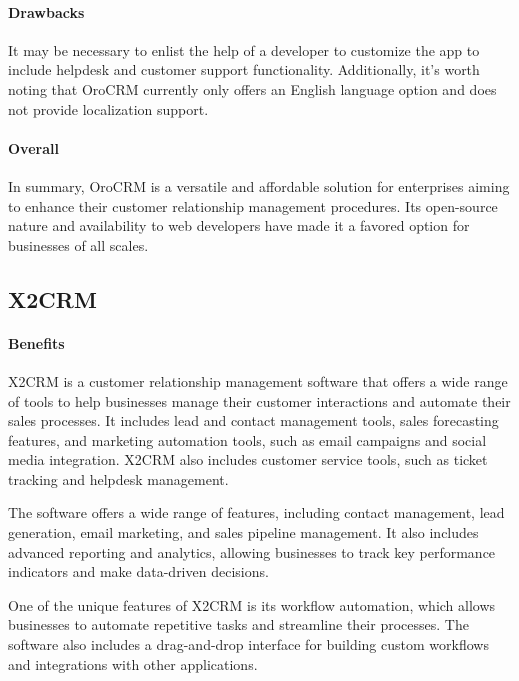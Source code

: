 \documentclass{article}
\begin{document}
\paragraph{Drawbacks}

It may be necessary to enlist the help of a developer to customize the app to include helpdesk and customer support functionality. Additionally, it's worth noting that OroCRM currently only offers an English language option and does not provide localization support.

\paragraph{Overall}

In summary, OroCRM is a versatile and affordable solution for enterprises aiming to enhance their customer relationship management procedures. Its open-source nature and availability to web developers have made it a favored option for businesses of all scales.

\subsection{X2CRM}

\paragraph{Benefits}

X2CRM is a customer relationship management software that offers a wide range of tools to help businesses manage their customer interactions and automate their sales processes. It includes lead and contact management tools, sales forecasting features, and marketing automation tools, such as email campaigns and social media integration. X2CRM also includes customer service tools, such as ticket tracking and helpdesk management.

The software offers a wide range of features, including contact management, lead generation, email marketing, and sales pipeline management. It also includes advanced reporting and analytics, allowing businesses to track key performance indicators and make data-driven decisions.

One of the unique features of X2CRM is its workflow automation, which allows businesses to automate repetitive tasks and streamline their processes. The software also includes a drag-and-drop interface for building custom workflows and integrations with other applications.
\end{document}
